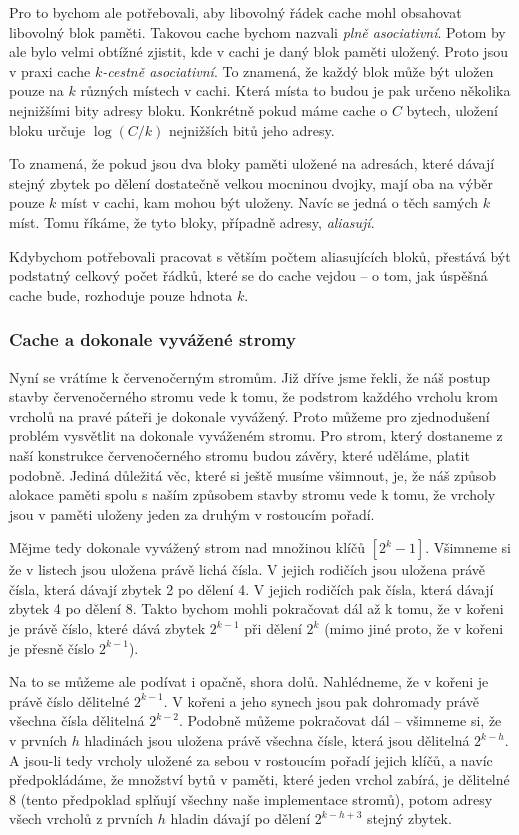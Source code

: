 Pro to bychom ale potřebovali, aby libovolný řádek cache mohl obsahovat
libovolný blok paměti. Takovou cache bychom nazvali \emph{plně asociativní}.
Potom by ale bylo velmi obtížné zjistit, kde v cachi je daný blok paměti
uložený. Proto jsou v praxi cache \emph{$k$-cestně asociativní}. To znamená, že
každý blok může být uložen pouze na $k$ různých místech v cachi. Která místa to
budou je pak určeno několika nejnižšími bity adresy bloku. Konkrétně pokud máme
cache o $C$ bytech, uložení bloku určuje $\log (C/k)$ nejnižších bitů jeho
adresy.

To znamená, že pokud jsou dva bloky paměti uložené na adresách, které dávají
stejný zbytek po dělení dostatečně velkou mocninou dvojky, mají oba na výběr
pouze $k$ míst v cachi, kam mohou být uloženy. Navíc se jedná o těch samých $k$
míst. Tomu říkáme, že tyto bloky, případně adresy, \emph{aliasují}.

Kdybychom potřebovali pracovat s větším počtem aliasujících bloků, přestává být
podstatný celkový počet řádků, které se do cache vejdou -- o tom, jak úspěšná
cache bude, rozhoduje pouze hdnota $k$.

\subsubsection{Cache a dokonale vyvážené stromy}\label{sec:cache_and_balanced}

Nyní se vrátíme k červenočerným stromům. Již dříve jsme řekli, že náš postup stavby červenočerného stromu vede k tomu, že podstrom každého vrcholu krom vrcholů na pravé páteři je dokonale vyvážený. Proto můžeme pro zjednodušení problém vysvětlit na dokonale vyváženém stromu. Pro strom, který dostaneme z naší konstrukce červenočerného stromu budou závěry, které uděláme, platit podobně. Jediná důležitá věc, které si ještě musíme všimnout, je, že náš způsob alokace paměti spolu s naším způsobem stavby stromu vede k tomu, že vrcholy jsou v paměti uloženy jeden za druhým v rostoucím pořadí.

Mějme tedy dokonale vyvážený strom nad množinou klíčů $[2^k-1]$. Všimneme si že v listech jsou uložena právě lichá čísla. V jejich rodičích jsou uložena právě čísla, která dávají zbytek 2 po dělení 4. V jejich rodičích pak čísla, která dávají zbytek 4 po dělení 8. Takto bychom mohli pokračovat dál až k tomu, že v kořeni je právě číslo, které dává zbytek $2^{k-1}$ při dělení $2^k$ (mimo jiné proto, že v kořeni je přesně číslo $2^{k-1}$).

Na to se můžeme ale podívat i opačně, shora dolů. Nahlédneme, že v kořeni je právě číslo dělitelné $2^{k-1}$. V kořeni a jeho synech jsou pak dohromady právě všechna čísla dělitelná $2^{k-2}$. Podobně můžeme pokračovat dál -- všimneme si, že v prvních $h$ hladinách jsou uložena právě všechna čísle, která jsou dělitelná $2^{k-h}$. A jsou-li tedy vrcholy uložené za sebou v rostoucím pořadí jejich klíčů, a navíc předpokládáme, že množství bytů v paměti, které jeden vrchol zabírá, je dělitelné 8 (tento předpoklad splňují všechny naše implementace stromů), potom adresy všech vrcholů z prvních $h$ hladin dávají po dělení $2^{k-h+3}$ stejný zbytek.

